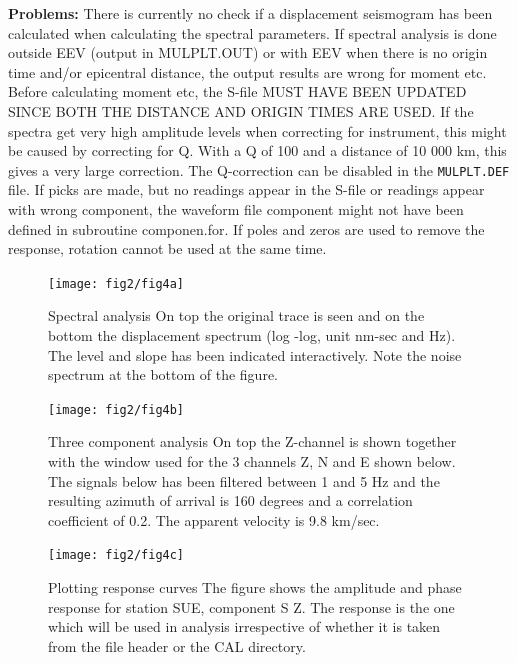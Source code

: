\textbf{Problems:}
There is currently no check if a displacement seismogram has been calculated when calculating the spectral parameters. If spectral analysis is done outside EEV (output in MULPLT.OUT) or with EEV when there is no origin time and/or epicentral distance, the output results are wrong for moment etc. Before calculating moment etc, the S-file MUST HAVE BEEN UPDATED SINCE BOTH THE DISTANCE AND ORIGIN TIMES ARE USED. If the spectra get very high amplitude levels when correcting for instrument, this might be caused by correcting for Q. With a Q of 100 and a distance of 10 000 km, this gives a very large correction. The Q-correction can be disabled in the \texttt{MULPLT.DEF} file. If picks are made, but no readings appear in the S-file or readings appear with wrong component, the waveform file component might not have been defined in subroutine componen.for. If poles and zeros are used to remove the response, rotation cannot be used at the same time. 

\begin{figure}
\centerline{\texttt{[image: fig2/fig4a]}}
\caption{Spectral analysis\newline
On top the original trace is seen and on the bottom the 
displacement spectrum (log -log, unit nm-sec and Hz). The level 
and slope has been indicated interactively. Note the noise spectrum 
at the bottom of the figure.}
\label{fig:mulplt-spec}
\end{figure}

\begin{figure}
\centerline{\texttt{[image: fig2/fig4b]}}
\caption{Three component analysis\newline
On top the Z-channel is shown together with the window used for the 
3 channels Z, N and E shown below. The signals below has been filtered 
between 1 and 5 Hz and the resulting azimuth of arrival is 160 degrees 
and a correlation coefficient of 0.2. The apparent velocity is 9.8 km/sec.}
\label{fig:mulplt-3comp}
\end{figure}

\begin{figure}
\centerline{\texttt{[image: fig2/fig4c]}}
\caption{Plotting response curves\newline
The figure shows the amplitude and phase response for station SUE, 
component S Z. The response is the one which will be used in analysis 
irrespective of whether it is taken from the file header or the CAL directory.}
\label{fig:mulplt-resp}
\end{figure}

